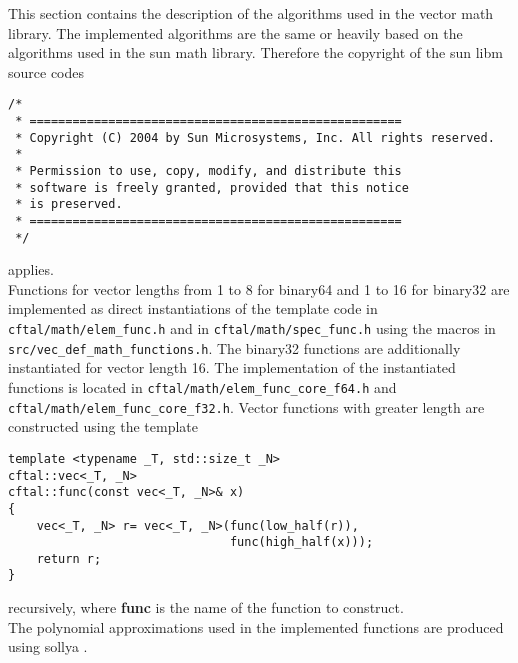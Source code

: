 \documentclass[10pt,a4paper,final,oneside]{article}
\numberwithin{equation}{subsection}
\begin{document}
This section contains the description of the algorithms used in the
vector math library. The implemented algorithms are the same or
heavily based on the algorithms used in the sun math
library. Therefore the copyright of the sun libm source codes
\small
\begin{verbatim}
/*
 * ====================================================
 * Copyright (C) 2004 by Sun Microsystems, Inc. All rights reserved.
 *
 * Permission to use, copy, modify, and distribute this
 * software is freely granted, provided that this notice
 * is preserved.
 * ====================================================
 */
\end{verbatim}
\normalsize
applies.\\[10pt]
%
Functions for vector lengths from 1 to 8 for binary64 and
1 to 16 for binary32 are implemented as direct instantiations of
the template code in
\lstinline{cftal/math/elem_func.h}
and in \lstinline{cftal/math/spec_func.h}
using the macros in
\lstinline{src/vec_def_math_functions.h}.
The binary32 functions are additionally instantiated for vector length 16.
The implementation of the instantiated functions is located in
\lstinline{cftal/math/elem_func_core_f64.h} and
\lstinline{cftal/math/elem_func_core_f32.h}.
Vector functions with greater length are constructed using the template
\begin{lstlisting}
template <typename _T, std::size_t _N>
cftal::vec<_T, _N>
cftal::func(const vec<_T, _N>& x)
{
    vec<_T, _N> r= vec<_T, _N>(func(low_half(r)),
                               func(high_half(x)));
    return r;
}
\end{lstlisting}
recursively, where \textbf{func} is the name of the
function to construct.\\[10pt]
The polynomial approximations used in the implemented functions
are produced using sollya \cite{ChevillardJoldesLauter2010}.
\end{document}
